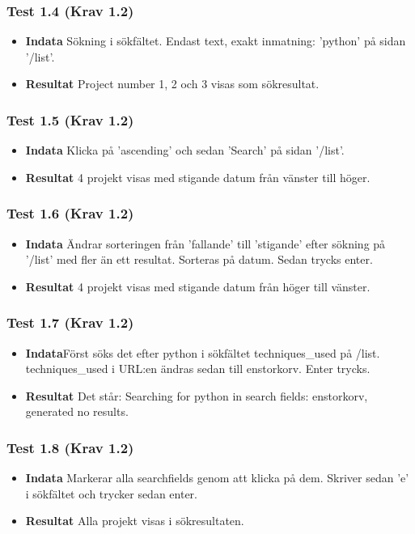 \documentclass{TDP003mall}
\begin{document}
\subsubsection*{Test 1.4 (Krav 1.2)}
\begin{itemize}
\item[]\textbf{Indata} Sökning i sökfältet. Endast text, exakt inmatning: 'python' på sidan '/list'.
\item[]\textbf{Resultat} Project number 1, 2 och 3 visas som sökresultat.
\end{itemize}
\subsubsection*{Test 1.5 (Krav 1.2)}
\begin{itemize}
\item[]\textbf{Indata} Klicka på 'ascending' och sedan 'Search' på sidan '/list'.
\item[]\textbf{Resultat} 4 projekt visas med stigande datum från vänster till höger.
\end{itemize}
\subsubsection*{Test 1.6 (Krav 1.2)}
\begin{itemize}
\item[]\textbf{Indata} Ändrar sorteringen från 'fallande' till 'stigande' efter sökning på '/list' med fler än ett resultat. Sorteras på datum. Sedan trycks enter.
\item[]\textbf{Resultat} 4 projekt visas med stigande datum från höger till vänster.
\end{itemize}
\subsubsection*{Test 1.7 (Krav 1.2)}
\begin{itemize}
\item[]\textbf{Indata}Först söks det efter python i sökfältet techniques\_used på /list. techniques\_used i URL:en ändras sedan till enstorkorv. Enter trycks.
\item[]\textbf{Resultat} Det står: Searching for python in search fields: enstorkorv, generated no results.
\end{itemize}
\subsubsection*{Test 1.8 (Krav 1.2)}
\begin{itemize}
\item[]\textbf{Indata} Markerar alla searchfields genom att klicka på dem. Skriver sedan 'e' i sökfältet och trycker sedan enter.
\item[]\textbf{Resultat} Alla projekt visas i sökresultaten.
\end{itemize}
\end{document}
